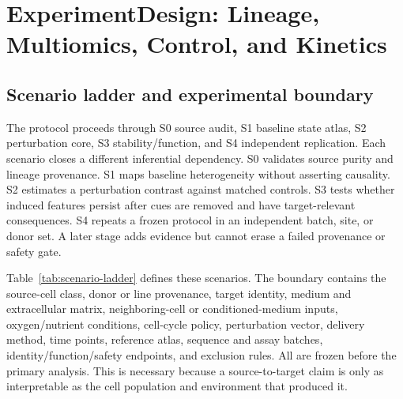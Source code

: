 \documentclass[10pt,conference]{IEEEtran}
\begin{document}
\section{ExperimentDesign: Lineage, Multiomics, Control, and Kinetics}
\label{sec:design}

\subsection{Scenario ladder and experimental boundary}

The protocol proceeds through S0 source audit, S1 baseline state atlas, S2 perturbation core, S3 stability/function, and S4 independent replication. Each scenario closes a different inferential dependency. S0 validates source purity and lineage provenance. S1 maps baseline heterogeneity without asserting causality. S2 estimates a perturbation contrast against matched controls. S3 tests whether induced features persist after cues are removed and have target-relevant consequences. S4 repeats a frozen protocol in an independent batch, site, or donor set. A later stage adds evidence but cannot erase a failed provenance or safety gate.

Table~\ref{tab:scenario-ladder} defines these scenarios. The boundary contains the source-cell class, donor or line provenance, target identity, medium and extracellular matrix, neighboring-cell or conditioned-medium inputs, oxygen/nutrient conditions, cell-cycle policy, perturbation vector, delivery method, time points, reference atlas, sequence and assay batches, identity/function/safety endpoints, and exclusion rules. All are frozen before the primary analysis. This is necessary because a source-to-target claim is only as interpretable as the cell population and environment that produced it.
\end{document}
